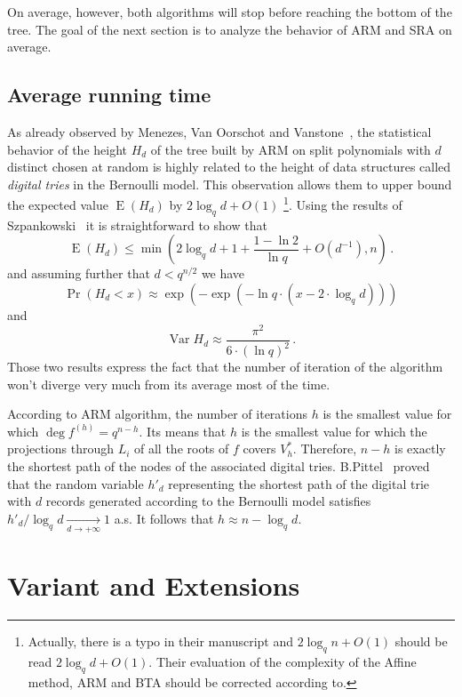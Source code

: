 \documentclass{sig-alternate}
\newcommand{\dd}{d}
\newcommand{\qq}{q}
\newcommand{\nn}{n}
\DeclareMathOperator{\Var}{Var}
\DeclareMathOperator{\Exp}{E}
\newcommand{\bigO}{O}
\newcounter{algo}
\begin{document}
 On average, however, both algorithms will stop before reaching the
 bottom of the tree. The goal of the next section is to analyze the
 behavior of ARM and SRA on average.

\subsection{Average running time}

 As already observed by Menezes, Van Oorschot and Vanstone~\cite{Menvanovans92}, 
the statistical behavior of the height $H_{\dd}$ of the tree built by ARM on split polynomials with $\dd$ distinct chosen at random is highly 
related to the height of data structures called \emph{digital tries} in the Bernoulli model. This observation allows them to upper bound the expected value $\Exp(H_{\dd})$ by $2\log_q \dd + \bigO(1)$
\footnote{Actually, there is a typo in their manuscript and $ 2\log_q \nn + \bigO(1)$ should be read $2\log_q \dd + \bigO(1)$. Their evaluation of the complexity of the Affine method, ARM and BTA should be corrected according to.}.
 Using the results of Szpankowski~\cite{szpankowski1986analysis} it is straightforward to show that 
   $$\Exp(H _\dd) \le  \min(2 \log_\qq \dd +1 +\frac{1-\ln 2}{\ln \qq} + \bigO(\dd^{-1}), \nn)\,.$$
and assuming further that $\dd < \qq^{n/2}$ we have
 $$\Pr(H_\dd <x) \approx \exp(-\exp(-\ln \qq \cdot (x-2 \cdot \log_\qq \dd)))$$ 
 and 
 $$\Var H_\dd \approx \frac{\pi^2}{6 \cdot (\ln \qq)^2} \,.$$
Those two results express the fact that the number of iteration of the algorithm won't diverge very much from its average most of the time.

\medskip



 According to ARM algorithm, the number of iterations $h$ is the smallest value for which $\deg f^{(h)}=\qq^{n-h}$. Its means that $h$ is the 
  smallest value for which the projections through $L_i$ of all the roots of $f$ covers $V_h^\ast$. Therefore, $n-h$ is exactly the shortest
   path of the nodes of the associated digital tries. B.Pittel~\cite{Pittel86} proved that the random variable $h'_d$ representing the shortest path of the digital trie with $d$ records generated according to the Bernoulli model satisfies
 $h'_d/\log_{q} d \underset{d \to +\infty}{\longrightarrow} 1$ a.s. It follows that $h \approx n-\log_{q} d$.

  


\section{Variant and Extensions}
\end{document}

